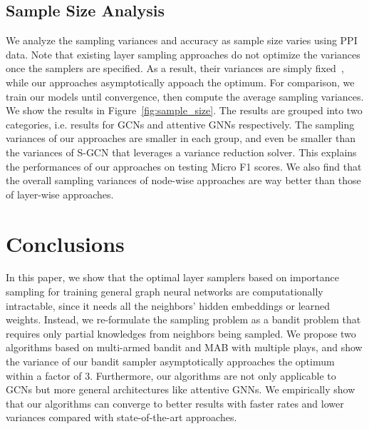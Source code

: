 \documentclass{article}
\begin{document}
\subsection{Sample Size Analysis}
We analyze the sampling variances and accuracy
as sample size varies using PPI data.
Note that existing layer sampling approaches do not
optimize the variances once the 
samplers are specified. As a result, their
variances are simply fixed~\cite{zou2019layer}, while
our approaches asymptotically appoach the optimum.
For comparison, we train our models until convergence,
then compute the average sampling variances. 
We show the results in Figure~\ref{fig:sample_size}.
The results are grouped into two categories, i.e.
results for GCNs and attentive GNNs respectively.
The sampling variances of our approaches are smaller 
in each group, and even be smaller than the 
variances of S-GCN that leverages a variance reduction solver. 
This explains the
performances of our approaches on testing Micro F1 scores.
We also find that the overall sampling variances of node-wise
approaches are way better than those of layer-wise
approaches.



\section{Conclusions}
In this paper, we show that the optimal layer samplers
based on importance sampling for training general 
graph neural networks are computationally intractable,
since it needs all the neighbors' hidden embeddings 
or learned weights.
Instead, we re-formulate the sampling problem as a bandit problem
that requires only partial knowledges from neighbors being sampled.
We propose two algorithms based on multi-armed bandit and MAB with
multiple plays, and show the variance of our bandit sampler 
asymptotically approaches the optimum within a factor of $3$.
Furthermore, our algorithms are not only applicable to 
GCNs but more general architectures like attentive GNNs.
We empirically show that our algorithms can converge to 
better results with faster rates and lower variances
compared with state-of-the-art approaches.
\end{document}
